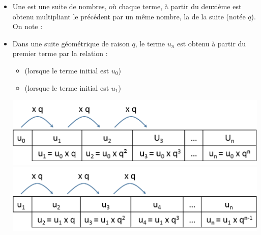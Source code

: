 \documentclass[12pt,a4paper]{article}
\begin{document}
\begin{mybilan}
	\begin{itemize}
		
		\item Une  est une suite de nombres, où chaque terme, à partir du deuxième est obtenu multipliant le précédent par un même nombre, la  de la suite (notée $q$).	
		On note :
		
		\item 		Dans une suite géométrique de raison $q$, le terme $u_n$ est obtenu à partir du premier terme par la relation :
		\begin{itemize}
			\item {} (lorsque le terme initial est $u_0$) 
			\item {} (lorsque le terme initial est $u_1$)
		\end{itemize}
		
		\begin{multicols}{2}
			\includegraphics[scale=0.4]{./img/geo1}
			\includegraphics[scale=0.4]{./img/geo2}
		\end{multicols}
	\end{itemize}
\end{mybilan}	
\end{document}
